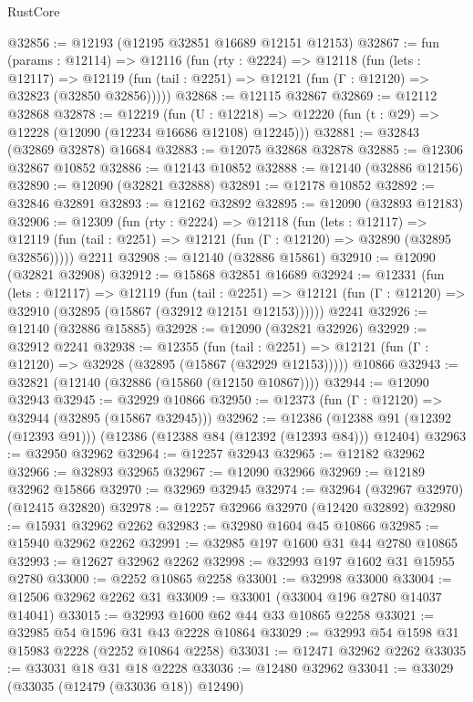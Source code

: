 \begin{lexlean}{RustCore}
\begin{coremodule}
@32856 := @12193 (@12195 @32851 @16689 @12151 @12153)
@32867 := fun (params : @12114) =>
  @12116
    (fun (rty : @2224) =>
    @12118
      (fun (lets : @12117) =>
      @12119 (fun (tail : @2251) => @12121 (fun (Γ : @12120) => @32823 (@32850 @32856)))))
@32868 := @12115 @32867
@32869 := @12112 @32868
@32878 := @12219
    (fun (U : @12218) => @12220 (fun (t : @29) => @12228 (@12090 (@12234 @16686 @12108) @12245)))
@32881 := @32843 (@32869 @32878) @16684
@32883 := @12075 @32868 @32878
@32885 := @12306 @32867 @10852
@32886 := @12143 @10852
@32888 := @12140 (@32886 @12156)
@32890 := @12090 (@32821 @32888)
@32891 := @12178 @10852
@32892 := @32846 @32891
@32893 := @12162 @32892
@32895 := @12090 (@32893 @12183)
@32906 := @12309
    (fun (rty : @2224) =>
    @12118
      (fun (lets : @12117) =>
      @12119 (fun (tail : @2251) => @12121 (fun (Γ : @12120) => @32890 (@32895 @32856)))))
    @2211
@32908 := @12140 (@32886 @15861)
@32910 := @12090 (@32821 @32908)
@32912 := @15868 @32851 @16689
@32924 := @12331
    (fun (lets : @12117) =>
    @12119
      (fun (tail : @2251) =>
      @12121 (fun (Γ : @12120) => @32910 (@32895 (@15867 (@32912 @12151 @12153))))))
    @2241
@32926 := @12140 (@32886 @15885)
@32928 := @12090 (@32821 @32926)
@32929 := @32912 @2241
@32938 := @12355
    (fun (tail : @2251) => @12121 (fun (Γ : @12120) => @32928 (@32895 (@15867 (@32929 @12153)))))
    @10866
@32943 := @32821 (@12140 (@32886 (@15860 (@12150 @10867))))
@32944 := @12090 @32943
@32945 := @32929 @10866
@32950 := @12373 (fun (Γ : @12120) => @32944 (@32895 (@15867 @32945)))
@32962 := @12386
    (@12388 @91 (@12392 (@12393 @91)))
    (@12386 (@12388 @84 (@12392 (@12393 @84))) @12404)
@32963 := @32950 @32962
@32964 := @12257 @32943
@32965 := @12182 @32962
@32966 := @32893 @32965
@32967 := @12090 @32966
@32969 := @12189 @32962 @15866
@32970 := @32969 @32945
@32974 := @32964 (@32967 @32970) (@12415 @32820)
@32978 := @12257 @32966 @32970 (@12420 @32892)
@32980 := @15931 @32962 @2262
@32983 := @32980 @1604 @45 @10866
@32985 := @15940 @32962 @2262
@32991 := @32985 @197 @1600 @31 @44 @2780 @10865
@32993 := @12627 @32962 @2262
@32998 := @32993 @197 @1602 @31 @15955 @2780
@33000 := @2252 @10865 @2258
@33001 := @32998 @33000
@33004 := @12506 @32962 @2262 @31
@33009 := @33001 (@33004 @196 @2780 @14037 @14041)
@33015 := @32993 @1600 @62 @44 @33 @10865 @2258
@33021 := @32985 @54 @1596 @31 @43 @2228 @10864
@33029 := @32993 @54 @1598 @31 @15983 @2228 (@2252 @10864 @2258)
@33031 := @12471 @32962 @2262
@33035 := @33031 @18 @31 @18 @2228
@33036 := @12480 @32962
@33041 := @33029 (@33035 (@12479 (@33036 @18)) @12490)

\end{coremodule}
\end{lexlean}
